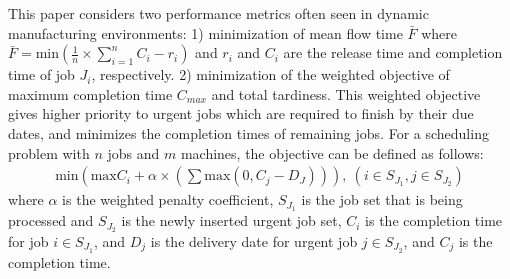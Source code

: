 This paper considers two performance metrics often seen in dynamic manufacturing environments: 1) minimization of mean flow time $\bar{F}$ where $\bar{F} = \text{min}(\frac{1}{n} \times \sum_{i = 1}^n C_i - r_i)$ and $r_i$ and $C_i$ are the release time and completion time of job $J_i$, respectively.
2) minimization of the weighted objective of maximum completion time $C_{max}$ and total tardiness. This weighted objective gives higher priority to urgent jobs which are required to finish by their due dates, and minimizes the completion times of remaining jobs.
For a scheduling problem with $n$ jobs and $m$ machines, the objective can be defined as follows:
\begin{align}
	\text{min}(\text{max}C_i + \alpha \times (\sum\text{max}(0, C_j - D_J))), \ (i \in S_{J_1}, j \in S_{J_2})
\end{align}
where $\alpha$ is the weighted penalty coefficient, $S_{J_1}$ is the job set that is being processed and $S_{J_2}$ is the newly inserted urgent job set, $C_i$ is the completion time for job $i \in S_{J_1}$, and $D_j$ is the delivery date for urgent job $j \in S_{J_2}$, and $C_j$ is the completion time.